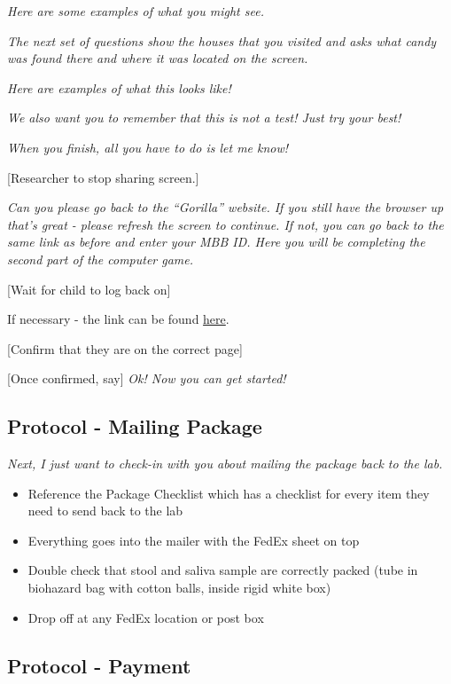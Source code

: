 \documentclass[]{book}
\providecommand{\tightlist}{%
  \setlength{\itemsep}{0pt}\setlength{\parskip}{0pt}}
\begin{document}
\emph{Here are some examples of what you might see.}

\emph{The next set of questions show the houses that you visited and asks what candy was found there and where it was located on the screen.}

\emph{Here are examples of what this looks like!}

\emph{We also want you to remember that this is not a test! Just try your best!}

\emph{When you finish, all you have to do is let me know!}

{[}Researcher to stop sharing screen.{]}

\emph{Can you please go back to the ``Gorilla'' website. If you still have the browser up that's great - please refresh the screen to continue. If not, you can go back to the same link as before and enter your MBB ID. Here you will be completing the second part of the computer game.}

{[}Wait for child to log back on{]}

If necessary - the link can be found \href{https://research.sc/participant/login/20451/publicid}{here}.

{[}Confirm that they are on the correct page{]}

{[}Once confirmed, say{]} \emph{Ok! Now you can get started!}

\hypertarget{protocol---mailing-package}{%
\subsection{Protocol - Mailing Package}\label{protocol---mailing-package}}

\emph{Next, I just want to check-in with you about mailing the package back to the lab.}

\begin{itemize}
\tightlist
\item
  Reference the Package Checklist which has a checklist for every item they need to send back to the lab
\item
  Everything goes into the mailer with the FedEx sheet on top
\item
  Double check that stool and saliva sample are correctly packed (tube in biohazard bag with cotton balls, inside rigid white box)
\item
  Drop off at any FedEx location or post box
\end{itemize}

\hypertarget{protocol---payment}{%
\subsection{Protocol - Payment}\label{protocol---payment}}
\end{document}
